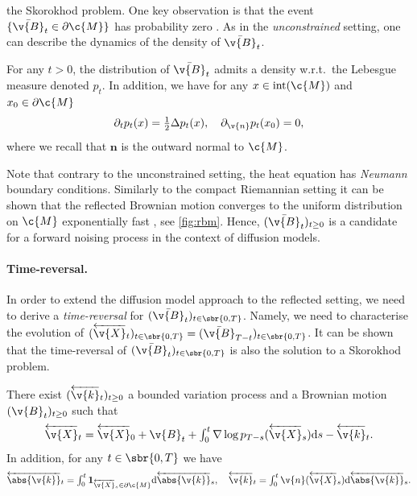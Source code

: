 the Skorokhod problem.
One key observation is that the event $\{ \bar{ \v{B}}_t \in \partial \c{M} \}$ has probability zero \parencite[Section 7, Lemma 7]{harrison1987brownian}.
As in the \emph{unconstrained} setting, one can describe the dynamics of the density of $\bar{ \v{B}}_t$.
\begin{proposition}
	For any $t > 0$, the distribution of $\bar{ \v{B}}_t$ admits a density w.r.t.\
	the Lebesgue measure denoted $p_t$.
	In addition, we have for any $x \in \mathrm{int}(\c{M})$ and $x_0 \in \partial \c{M}$ \begin{equation} \label{eq:heat_eq_rbm} \partial_t p_t(x) = \tfrac{1}{2} \Delta p_t(x) , \quad \partial_{ \v{n}} p_t(x_0) = 0 , \end{equation} where we recall that $\mathbf{n}$ is the outward normal to $\c{M}$.
\end{proposition}

Note that contrary to the unconstrained setting, the heat equation has \emph{Neumann} boundary conditions.
Similarly to the compact Riemannian setting \parencite{saloff1994precise} it can be shown that the reflected Brownian motion converges to the uniform distribution on $\c{M}$ exponentially fast \parencite{loper2020uniform,burdzy2006traps}, see \cref{fig:rbm}.
Hence, $(\bar{ \v{B}}_t)_{t \geq 0}$ is a candidate for a forward noising process in the context of diffusion models.

\paragraph{Time-reversal.}
In order to extend the diffusion model approach to the reflected setting, we need to derive a \emph{time-reversal} for $(\bar{ \v{B}}_t)_{t \in \sbr{0,T}}$.
Namely, we need to characterise the evolution of $(\overleftarrow{ \v{X}}_t)_{t \in \sbr{0,T}} = (\bar{ \v{B}}_{T-t})_{t \in \sbr{0,T}}$.
It can be shown that the time-reversal of $(\bar{ \v{B}}_t)_{t \in \sbr{0,T}}$ is also the solution to a Skorokhod problem.

\begin{theorem}
	\label{sec:time-reversal-reflected}
	There exist $(\overleftarrow{ \v{k}}_t)_{t \geq 0}$ a bounded variation process and a Brownian motion $( \v{B}_t)_{t \geq0}$ such that \begin{equation} \textstyle{ \overleftarrow{ \v{X}}_t = \overleftarrow{ \v{X}}_0 + \v{B}_t + \int_0^t \nabla \log p_{T-s}(\overleftarrow{ \v{X}}_s) \mathrm{d} s - \overleftarrow{ \v{k}}_t .
		}
	\end{equation}
	In addition, for any $t \in \sbr{0,T}$ we have \begin{equation} \label{eq:skorokhod_reversal} \textstyle{\overleftarrow{\abs{ \v{k}}}_t = \int_0^t \mathbf{1}_{\overleftarrow{ \v{X}}_s \in \partial \c{M}} \mathrm{d} \overleftarrow{\abs{ \v{k}}}_s , \quad \overleftarrow{ \v{k}}_t = \int_0^t \v{n}(\overleftarrow{ \v{X}}_s) \mathrm{d} \overleftarrow{\abs{ \v{k}}}_s .
		}
	\end{equation}
\end{theorem}

